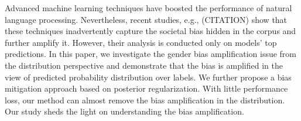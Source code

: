 Advanced machine learning techniques have boosted the performance of natural language processing. Nevertheless, recent studies, e.g., (CITATION) show that these techniques inadvertently capture the societal bias hidden in the corpus and further amplify it. However, their analysis is conducted only on models' top predictions. In this paper, we investigate the gender bias amplification issue from the distribution perspective and demonstrate that the bias is amplified in the view of predicted probability distribution over labels. We further propose a bias mitigation approach based on posterior regularization. With little performance loss, our method can almost remove the bias amplification in the distribution. Our study sheds the light on understanding the bias amplification.
